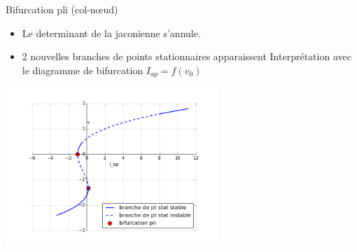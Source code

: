 \documentclass[xcolor={dvipsnames},10pt]{beamer}
\begin{document}
\begin{frame}{Bifurcation pli (col-n\oe ud)}
\begin{itemize}
\item Le determinant de la jaconienne s'annule.
\item 2 nouvelles branches de points stationnaires apparaissent
Interprétation avec le diagramme de bifurcation $I_{ap}= f(v_0)$
\end{itemize}








\end{frame}

\begin{frame}
\begin{center}
\includegraphics[width=0.6\textwidth]{bif3.png}
\end{center}
\end{frame}
\end{document}
